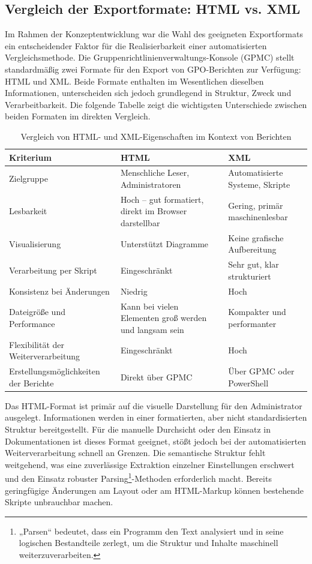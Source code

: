 \subsection{Vergleich der Exportformate: HTML vs. XML }
    Im Rahmen der Konzeptentwicklung war die Wahl des geeigneten Exportformats ein entscheidender Faktor für die Realisierbarkeit einer automatisierten Vergleichsmethode. Die Gruppenrichtlinienverwaltungs-Konsole (GPMC) stellt standardmäßig zwei Formate für den Export von GPO-Berichten zur Verfügung: HTML und XML. Beide Formate enthalten im Wesentlichen dieselben Informationen, unterscheiden sich jedoch grundlegend in Struktur, Zweck und Verarbeitbarkeit. Die folgende Tabelle zeigt die wichtigsten Unterschiede zwischen beiden Formaten im direkten Vergleich.
    \begin{table}[H]
\centering
\renewcommand{\arraystretch}{1.3} %
\begin{tabularx}{\textwidth}{@{}p{3.5cm}Xp{3.5cm}@{}}
\toprule
\textbf{Kriterium} & \textbf{HTML} & \textbf{XML} \\
\midrule
Zielgruppe & Menschliche Leser, Administratoren & Automatisierte Systeme, Skripte \\
Lesbarkeit & Hoch – gut formatiert, direkt im Browser darstellbar & Gering, primär maschinenlesbar \\
Visualisierung & Unterstützt Diagramme & Keine grafische Aufbereitung \\
Verarbeitung per Skript & Eingeschränkt & Sehr gut, klar strukturiert \\
Konsistenz bei Änderungen & Niedrig & Hoch \\
Dateigröße und Performance & Kann bei vielen Elementen groß werden und langsam sein & Kompakter und performanter \\
Flexibilität der Weiterverarbeitung & Eingeschränkt & Hoch \\
Erstellungsmöglichkeiten der Berichte & Direkt über GPMC & Über GPMC oder PowerShell \\
\bottomrule
\end{tabularx}
\caption{Vergleich von HTML- und XML-Eigenschaften im Kontext von Berichten}
\label{tab:html-vs-xml}
\end{table}
Das HTML-Format ist primär auf die visuelle Darstellung für den Administrator ausgelegt. Informationen werden in einer formatierten, aber nicht standardisierten Struktur bereitgestellt. Für die manuelle Durchsicht oder den Einsatz in Dokumentationen ist dieses Format geeignet, stößt jedoch bei der automatisierten Weiterverarbeitung schnell an Grenzen. Die semantische Struktur fehlt weitgehend, was eine zuverlässige Extraktion einzelner Einstellungen erschwert und den Einsatz robuster Parsing\footnote{„Parsen“ bedeutet, dass ein Programm den Text analysiert und in seine logischen Bestandteile zerlegt, um die Struktur und Inhalte maschinell weiterzuverarbeiten.}-Methoden erforderlich macht. Bereits geringfügige Änderungen am Layout oder am HTML-Markup können bestehende Skripte unbrauchbar machen.\newline
